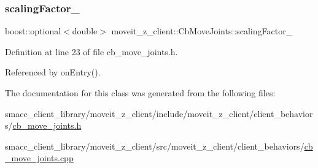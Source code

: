\subsubsection{\texorpdfstring{scaling\+Factor\+\_\+}{scalingFactor\_}}
{\footnotesize\ttfamily boost\+::optional$<$double$>$ moveit\+\_\+z\+\_\+client\+::\+Cb\+Move\+Joints\+::scaling\+Factor\+\_\+}



Definition at line 23 of file cb\+\_\+move\+\_\+joints.\+h.



Referenced by on\+Entry().



The documentation for this class was generated from the following files\+:\begin{DoxyCompactItemize}
\item 
smacc\+\_\+client\+\_\+library/moveit\+\_\+z\+\_\+client/include/moveit\+\_\+z\+\_\+client/client\+\_\+behaviors/\hyperlink{cb__move__joints_8h}{cb\+\_\+move\+\_\+joints.\+h}\item 
smacc\+\_\+client\+\_\+library/moveit\+\_\+z\+\_\+client/src/moveit\+\_\+z\+\_\+client/client\+\_\+behaviors/\hyperlink{cb__move__joints_8cpp}{cb\+\_\+move\+\_\+joints.\+cpp}\end{DoxyCompactItemize}
